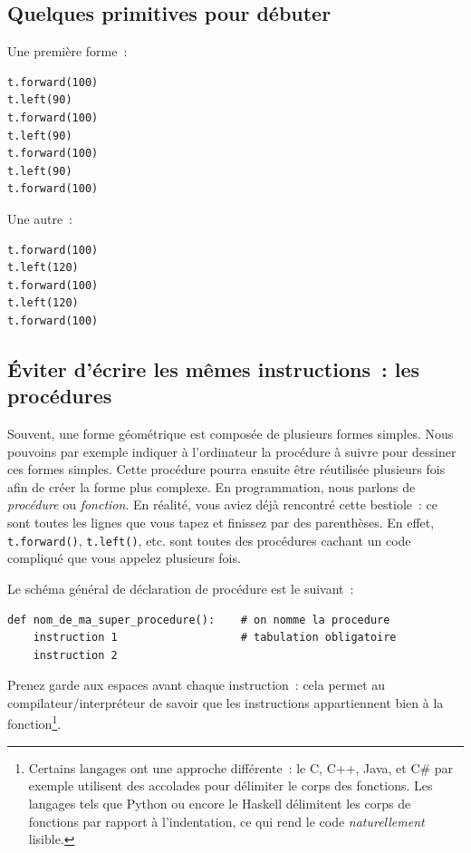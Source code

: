 \documentclass[11pt,a4paper]{article}
\begin{document}
\subsection{Quelques primitives pour débuter}
Une première forme~:

\begin{lstlisting}
t.forward(100)
t.left(90)
t.forward(100)
t.left(90)
t.forward(100)
t.left(90)
t.forward(100)
\end{lstlisting}

Une autre~:

\begin{lstlisting}
t.forward(100)
t.left(120)
t.forward(100)
t.left(120)
t.forward(100)
\end{lstlisting}

\subsection{Éviter d'écrire les mêmes instructions~: les procédures}

Souvent, une forme géométrique est composée de plusieurs formes simples. Nous
pouvoins par exemple indiquer à l'ordinateur la procédure à suivre pour dessiner
ces formes simples. Cette procédure pourra ensuite être réutilisée plusieurs
fois afin de créer la forme plus complexe. En programmation, nous parlons de
\emph{procédure} ou \emph{fonction}. En réalité, vous aviez déjà rencontré cette
bestiole~: ce sont toutes les lignes que vous tapez et finissez par des
parenthèses. En effet, \lstinline{t.forward()}, \lstinline{t.left()},
etc. sont toutes des procédures cachant un code compliqué que vous appelez
plusieurs fois.

Le schéma général de déclaration de procédure est le suivant~:

\begin{lstlisting}
def nom_de_ma_super_procedure():    # on nomme la procedure
    instruction 1                   # tabulation obligatoire
    instruction 2
\end{lstlisting}

Prenez garde aux espaces avant chaque instruction~: cela permet au
compilateur/interpréteur de savoir que les instructions appartiennent
bien à la fonction\footnote{Certains langages ont une approche différente~: le
C, C++, Java, et C\# par exemple utilisent des accolades pour délimiter le corps
des fonctions. Les langages tels que Python ou encore le Haskell délimitent les
corps de fonctions par rapport à l'indentation, ce qui rend le code
\emph{naturellement} lisible.}.
\end{document}
